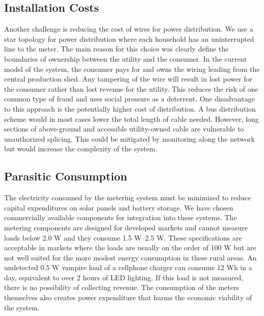 \documentclass{sig-alternate}
\begin{document}
\subsection{Installation Costs}
Another challenge is reducing the cost of wires for power distribution.
We use a star topology for power distribution where each household has an
uninterrupted line to the meter.
The main reason for this
choice was clearly define the boundaries of ownership between the utility
and the consumer.
In the current model of the system, the consumer pays for
and owns the wiring leading from the central production shed.  Any tampering
of the wire will result in lost power for the consumer rather than lost
revenue for the utility.  This reduces the risk of one common type of fraud
and uses social pressure as a deterrent.
One disadvantage to this approach is the potentially higher cost of distribution.
A bus distribution scheme would in most cases lower the total length of
cable needed.  However, long sections of above-ground and accessible
utility-owned cable are vulnerable to unauthorized splicing.
This could be mitigated by monitoring along the network but would increase
the complexity of the system.

\subsection{Parasitic Consumption}
The electricity consumed by the metering system must be minimized to
reduce capital expenditures on solar panels and battery storage.  We
have chosen commercially available components for integration into
these systems.  The metering components are designed for developed markets
and cannot measure loads below 2.0 W and they consume 1.5 W--2.5 W.  These
specifications are acceptable in markets where the loads are usually
on the order of 100 W but are not well suited for the more modest
energy consumption in these rural areas.  An undetected 0.5 W vampire load of a
cellphone charger can consume 12 Wh in a day, equivalent to over 2 hours
of LED lighting.  If this load is not measured, there
is no possibility of collecting revenue.  The consumption of the meters
themselves also creates power expenditure that harms the economic viability
of the system.
\end{document}
